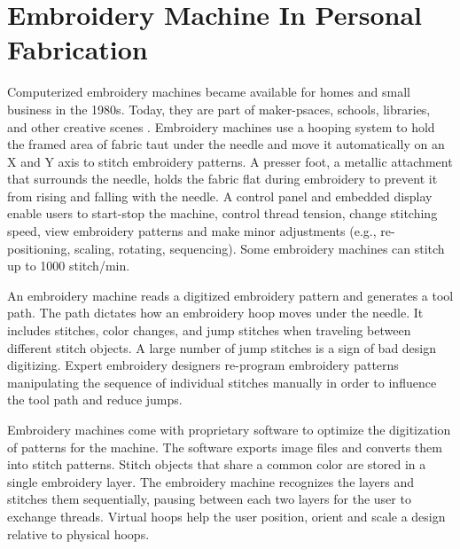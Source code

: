 \documentclass[header.tex]{subfiles}
\begin{document}



\section{Embroidery Machine In Personal Fabrication}
Computerized embroidery machines became available for homes and small business in the 1980s. Today, they are part of maker-psaces, schools, libraries, and other creative scenes \cite{}. 
Embroidery machines use a hooping system to hold the framed area of fabric taut under the needle and move it automatically on an X and Y axis to stitch embroidery patterns. A presser foot, a metallic attachment that surrounds the needle, holds the fabric flat during embroidery to prevent it from rising and falling with the needle. A control panel and embedded display enable users to start-stop the machine, control thread tension, change stitching speed, view embroidery patterns and make minor adjustments (e.g., re-positioning, scaling, rotating, sequencing). Some embroidery machines can stitch up to 1000 stitch/min.

An embroidery machine reads a digitized embroidery pattern %
and generates a tool path. The path dictates how an embroidery hoop moves under the needle. It includes stitches, color changes, and jump stitches when traveling between different stitch objects. 
A large number of jump stitches is a sign of bad design digitizing. Expert embroidery designers re-program embroidery patterns manipulating the sequence of individual stitches manually in order to influence the tool path and reduce jumps.

Embroidery machines come with proprietary software to optimize the digitization of patterns for the machine. The software exports image files and converts them into stitch patterns. 
Stitch objects that share a common color are stored in a single embroidery layer. The embroidery machine recognizes the layers and stitches them sequentially, pausing between each two layers for the user to exchange threads. Virtual hoops help the user position, orient and scale a design relative to physical hoops. 
\end{document}
